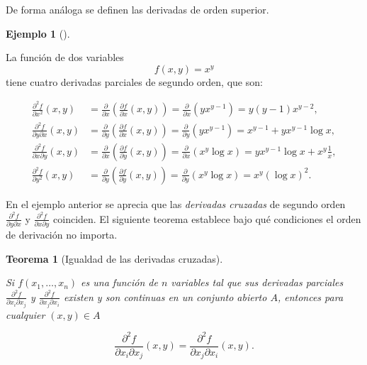 \documentclass[
  a4paper,
]{scrreport}
\theoremstyle{plain}
\theoremstyle{plain}
\newtheorem{theorem}{Teorema}[chapter]
\theoremstyle{definition}
\theoremstyle{definition}
\newtheorem{example}{Ejemplo}[chapter]
\theoremstyle{plain}
\theoremstyle{definition}
\theoremstyle{remark}
\begin{document}
De forma análoga se definen las derivadas de orden superior.

\begin{example}[]\protect\hypertarget{exm-derivadas-segundo-orden}{}\label{exm-derivadas-segundo-orden}

La función de dos variables \[f(x,y)=x^y\] tiene cuatro derivadas
parciales de segundo orden, que son:

\[\begin{aligned}
\frac{\partial^2 f}{\partial x^2}(x,y) &=
\frac{\partial}{\partial x}\left(\frac{\partial f}{\partial x}(x,y)\right) =
\frac{\partial}{\partial x}\left(yx^{y-1}\right) =
y(y-1)x^{y-2},\\
\frac{\partial^2 f}{\partial y \partial x}(x,y) &=
\frac{\partial}{\partial y}\left(\frac{\partial f}{\partial x}(x,y)\right) =
\frac{\partial}{\partial y}\left(yx^{y-1}\right) =
x^{y-1}+yx^{y-1}\log x,\\
\frac{\partial^2 f}{\partial x \partial y}(x,y) &=
\frac{\partial}{\partial x}\left(\frac{\partial f}{\partial y}(x,y)\right) =
\frac{\partial}{\partial x}\left(x^y\log x \right) =
yx^{y-1}\log x+x^y\frac{1}{x},\\
\frac{\partial^2 f}{\partial y^2}(x,y) &=
\frac{\partial}{\partial y}\left(\frac{\partial f}{\partial y}(x,y)\right) =
\frac{\partial}{\partial y}\left(x^y\log x \right) =
x^y(\log x)^2.\end{aligned}\]

\end{example}

En el ejemplo anterior se aprecia que las \emph{derivadas cruzadas} de
segundo orden \(\frac{\partial^2 f}{\partial y\partial x}\) y
\(\frac{\partial^2 f}{\partial x\partial y}\) coinciden. El siguiente
teorema establece bajo qué condiciones el orden de derivación no
importa.

\begin{theorem}[Igualdad de las derivadas
cruzadas]\protect\hypertarget{thm-igualdad-derivadas-cruzadas}{}\label{thm-igualdad-derivadas-cruzadas}

Si \(f(x_1,\ldots,x_n)\) es una función de \(n\) variables tal que sus
derivadas parciales \(\frac{\partial^2 f}{\partial x_i\partial x_j}\) y
\(\frac{\partial^2 f}{\partial x_j\partial x_i}\) existen y son
continuas en un conjunto abierto \(A\), entonces para cualquier
\((x,y)\in A\)

\[
\frac{\partial^2 f}{\partial x_i\partial x_j}(x,y) 
= \frac{\partial^2 f}{\partial x_j\partial x_i}(x,y).
\]

\end{theorem}
\end{document}

